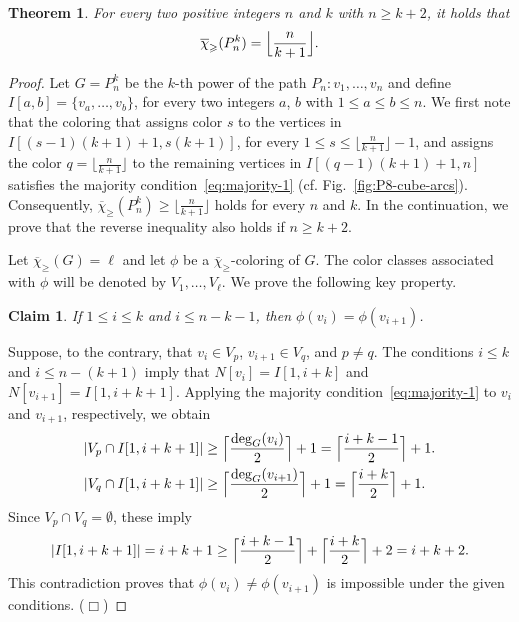 \documentclass{article}
\newtheorem{theorem}{Theorem}
\newtheorem{claim}{Claim}
\theoremstyle{definition}
\newcommand{\smallqed}{{\tiny ($\Box$)}}
\newcommand{\mc}{\overline{\chi}_{\geqslant}}
\begin{document}
\begin{theorem} \label{thm:power-paths}
For every two positive integers $n$ and $k$ with $n \ge k+2$, it holds that
    \begin{align} \label{eq:thm-path-k}
    \mc(P_n^k)= \Bigl\lfloor\frac{n}{k+1}\Bigr\rfloor.
\end{align}
\end{theorem}
\begin{proof}
    Let $G=P_n^k$ be the $k$-th power of the path $P_n \colon v_1, \dots, v_n$ and define $I[a,b]=\{v_a, \dots, v_b\}$, for every two integers $a$, $b$ with  $1\le a \le b \le n$. We first note that the coloring that assigns color $s$ to the vertices in $I[(s-1)(k+1)+1, s(k+1)]$, for every $1 \le s \le \lfloor \frac{n}{k+1} \rfloor -1$, and assigns the color $q= \lfloor \frac{n}{k+1} \rfloor $ to the remaining vertices in $I[(q-1)(k+1)+1, n]$ satisfies the majority condition~\eqref{eq:majority-1} (cf. Fig.~\ref{fig:P8-cube-arcs}). Consequently, $\mc(P_n^k) \ge \lfloor \frac{n}{k+1} \rfloor$ holds for every $n$ and $k$. In the continuation, we prove that the reverse inequality also holds if $n \ge k+2$.
    \medskip
    
    Let $\mc(G)=\ell$ and let $\phi$ be a $\mc$-coloring of $G$. The color classes associated with $\phi$ will be denoted by $V_1, \dots, V_\ell$. 
    We prove the following key property.
    \begin{claim} \label{claim:0}
        If $1 \le i \le k$ and $i \leq n-k-1$, then $\phi(v_i)=\phi(v_{i+1})$.
    \end{claim} 
    \proof Suppose, to the contrary, that $v_i \in V_p$, $v_{i+1} \in V_q$, and $p \neq q$. The conditions $i \leq k$ and $i \leq n-(k+1)$ imply that $N[v_i]=I[1,i+k]$ and $N[v_{i+1}]=I[1, i+k+1]$. Applying the majority condition~\eqref{eq:majority-1} to $v_i$ and $v_{i+1}$, respectively, we obtain
    \begin{align*}
        |V_p\cap I[1,i+k+1]| &\ge \Bigl\lceil \frac{\deg_G(v_i)}{2} \Bigr\rceil +1= \Bigl\lceil \frac{i+k-1}{2} \Bigr\rceil +1.\\
        |V_q\cap I[1,i+k+1]| &\ge \Bigl\lceil \frac{\deg_G(v_{i+1})}{2} \Bigr\rceil +1= \Bigl\lceil \frac{i+k}{2} \Bigr\rceil +1.   
        \end{align*}
        Since $V_p \cap V_q = \emptyset$, these imply 
        $$|I[1, i+k+1]|=i+k+1 \ge \Bigl\lceil \frac{i+k-1}{2} \Bigr\rceil + \Bigl\lceil \frac{i+k}{2} \Bigr\rceil +2= i+k+2.
        $$
       This contradiction proves that $\phi(v_i) \neq \phi(v_{i+1})$ is impossible under the given conditions. \smallqed
   \medskip
   

\end{proof}
\end{document}
